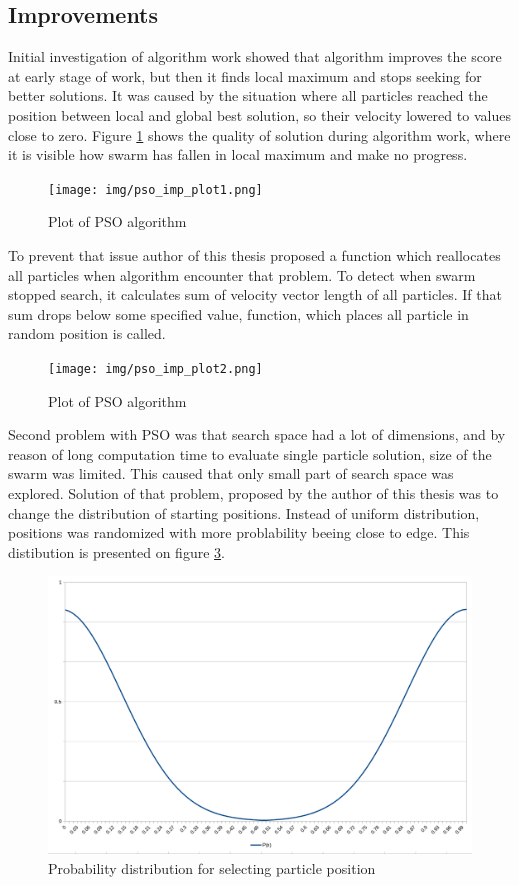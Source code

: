 \subsection{Improvements}\label{pso_improv}
Initial investigation of algorithm work showed that algorithm improves the score at early stage of work, but then it finds local maximum 
and stops seeking for better solutions. It was caused by the situation where all particles reached the position between 
local and global best solution, so their velocity lowered to values close to zero. Figure \ref{img_pso_imp_plot1} shows the quality of solution 
during algorithm work, where it is visible how swarm has fallen in local maximum and make no progress.
\begin{figure}[ht]
\centering
	\texttt{[image: img/pso\_imp\_plot1.png]}
	\caption{Plot of PSO algorithm }
	\label{img_pso_imp_plot1}
\end{figure}

To prevent that issue author of this thesis proposed a function which reallocates all particles when algorithm encounter that problem. 
To detect when swarm stopped search, it calculates sum of velocity vector length of all particles. 
If that sum drops below some specified value, function, which places all particle in random position is called. 
\begin{figure}[ht]
	\centering
	\texttt{[image: img/pso\_imp\_plot2.png]}
	\caption{Plot of PSO algorithm }
	\label{img_pso_imp_plot2}
\end{figure}

Second problem with PSO was that search space had a lot of dimensions, and by reason of long computation time to evaluate single particle solution, 
size of the swarm was limited. This caused that only small part of search space was explored. Solution of that problem, 
proposed by the author of this thesis was to change the distribution of starting positions. Instead of uniform distribution, positions was randomized 
with more problability beeing close to edge. This distibution is presented on figure \ref{img_pso_imp_dist}.

\begin{figure}[ht]
	\centering
	\includegraphics[scale=0.4]{img/pso_dist.png}
	\caption{Probability distribution for selecting particle position}
	\label{img_pso_imp_dist}
\end{figure}

